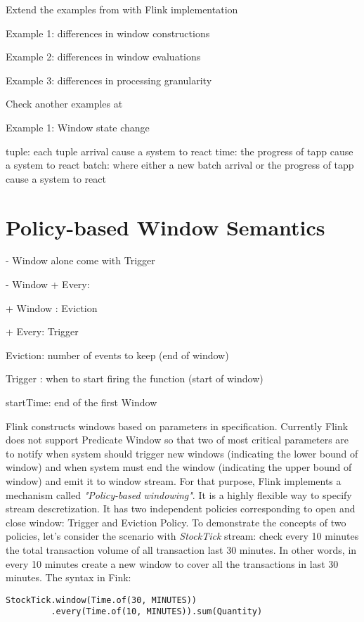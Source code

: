 Extend the examples from \citep{Dinda:2013} with Flink implementation

Example 1: differences in window constructions

Example 2: differences in window evaluations

Example 3: differences in processing granularity

Check another examples at \citep{Jain:2008}

Example 1: Window state change

tuple: each tuple arrival cause a system to react
time: the progress of tapp cause a system to react
batch:  where either a new batch arrival or the progress of tapp cause a system to react

\section{Policy-based Window Semantics}

- Window alone come with Trigger

- Window + Every:

+ Window : Eviction

+ Every: Trigger 


Eviction: number of events to keep (end of window)

Trigger : when to start firing the function (start of window)

startTime: end of the first Window


Flink constructs windows based on parameters in specification. Currently Flink does not support Predicate Window so that two of most critical parameters are to notify when system should trigger new windows (indicating the lower bound of window) and when system must end the window (indicating the upper bound of window) and emit it to window stream. For that purpose, Flink implements a mechanism called \textit{"Policy-based windowing"}. It is a highly flexible way to specify stream descretization. It has two independent policies corresponding to open and close window: Trigger and Eviction Policy.
To demonstrate the concepts of two policies, let's consider the scenario with \textit{StockTick} stream: check every 10 minutes the total transaction volume of all transaction last 30 minutes. In other words, in every 10 minutes create a new window to cover all the transactions in last 30 minutes. The syntax in Fink:

\begin{verbatim}
StockTick.window(Time.of(30, MINUTES))
		 .every(Time.of(10, MINUTES)).sum(Quantity)
\end{verbatim}

